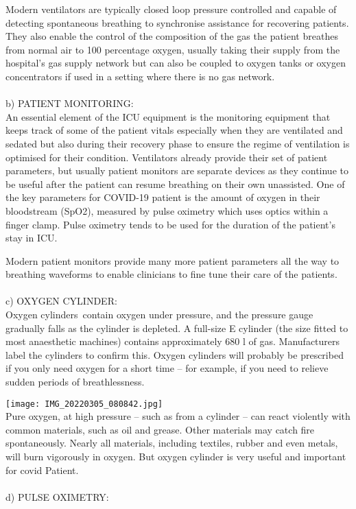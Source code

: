\documentclass{article}
\begin{document}
Modern ventilators are typically closed loop pressure controlled and capable of detecting spontaneous breathing to synchronise assistance for recovering patients. They also enable the control of the composition of the gas the patient breathes from normal air to 100 percentage oxygen, usually taking their supply from the hospital’s gas supply network but can also be coupled to oxygen tanks or oxygen concentrators if used in a setting where there is no gas network.\\
\\
b) PATIENT MONITORING:\\
An essential element of the ICU equipment is the monitoring equipment that keeps track of some of the patient vitals especially when they are ventilated and sedated but also during their recovery phase to ensure the regime of ventilation is optimised for their condition. Ventilators already provide their set of patient parameters, but usually patient monitors are separate devices as they continue to be useful after the patient can resume breathing on their own unassisted.
One of the key parameters for COVID-19 patient is the amount of oxygen in their bloodstream (SpO2), measured by pulse oximetry which uses optics within a finger clamp. Pulse oximetry tends to be used for the duration of the patient’s stay in ICU.

Modern patient monitors provide many more patient parameters all the way to breathing waveforms to enable clinicians to fine tune their care of the patients.\\ 
\\
c) OXYGEN CYLINDER:\\
 Oxygen cylinders contain oxygen under pressure, and the pressure gauge gradually falls as the cylinder is depleted. A full-size E cylinder (the size fitted to most anaesthetic machines) contains approximately 680 l of gas. Manufacturers label the cylinders to confirm this.
Oxygen cylinders will probably be prescribed if you only need oxygen for a short time – for example, if you need to relieve sudden periods of breathlessness.

 \texttt{[image: IMG\_20220305\_080842.jpg]} \\
Pure oxygen, at high pressure – such as from a cylinder – can react violently with common materials, such as oil and grease. Other materials may catch fire spontaneously. Nearly all materials, including textiles, rubber and even metals, will burn vigorously in oxygen. But oxygen cylinder is very useful and important for covid Patient.\\
\\
d) PULSE OXIMETRY:\\
\end{document}
